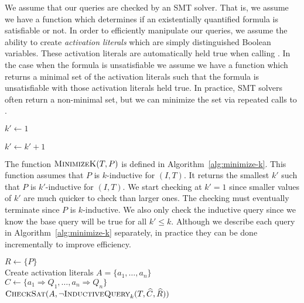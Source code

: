 We assume that our queries are checked by an SMT solver. That is, we
assume we have a function \checksat which determines if an
existentially quantified formula is satisfiable or not. In order to
efficiently manipulate our queries, we assume the ability to create
{\em activation literals} which are simply distinguished Boolean
variables. These activation literals are automatically held true when
calling \checksat. In the case when the formula is unsatisfiable we
assume we have a function \unsatcore which returns a minimal set of
the activation literals such that the formula is unsatisfiable with
those activation literals held true. In practice, SMT solvers often
return a non-minimal set, but we can minimize the set via repeated
calls to \checksat.

\begin{algorithm}[t]
  $k' \leftarrow 1$ \\
   {
     {
       \\
    }
    $k' \leftarrow k' + 1$ \\
  }
\caption{$\mink(T, P)$}
\label{alg:minimize-k}
\end{algorithm}

The function $\mink(T, P)$ is defined in
Algorithm~\ref{alg:minimize-k}. This function assumes that $P$ is
$k$-inductive for $(I, T)$. It returns the smallest $k'$ such that $P$
is $k'$-inductive for $(I, T)$. We start checking at $k' = 1$ since
smaller values of $k'$ are much quicker to check than larger ones. The
checking must eventually terminate since $P$ is $k$-inductive. We also
only check the inductive query since we know the base query will be
true for all $k' \leq k$. Although we describe each query in
Algorithm~\ref{alg:minimize-k} separately, in practice they can be done
incrementally to improve efficiency.

\begin{algorithm}[t]
  $R \leftarrow \{P\}$ \\
  Create activation literals $A = \{a_1, \ldots, a_n\}$ \\
  $C \leftarrow \{a_1 \Rightarrow Q_1, \ldots, a_n \Rightarrow Q_n\}$ \\
   {
    $\textsc{CheckSat}(A, \neg\textsc{InductiveQuery}_k(T, \widehat C, \widehat R))$ \\
  }
\caption{$\reduceinv_k(T, \{Q_1, \ldots, Q_n\}, P)$}
\label{alg:reduce-invariants}
\end{algorithm}

